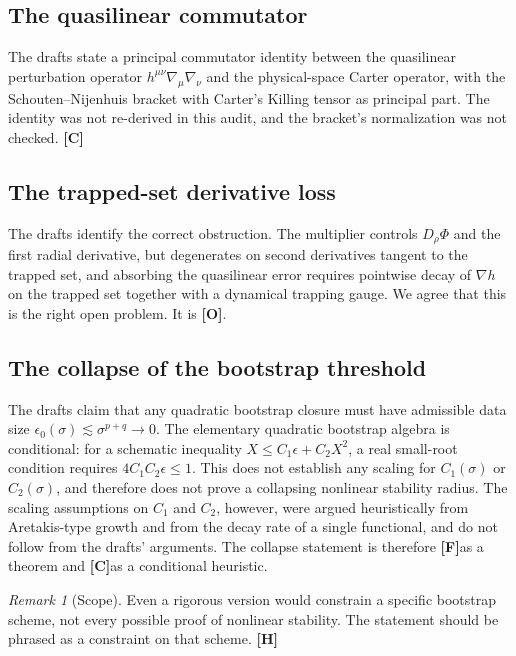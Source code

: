 \documentclass[11pt,a4paper]{article}
\newcommand{\VH}{\textcolor{vh}{\textbf{[H]}}}
\newcommand{\CC}{\textcolor{cc}{\textbf{[C]}}}
\newcommand{\FF}{\textcolor{ff}{\textbf{[F]}}}
\newcommand{\OO}{\textcolor{oo}{\textbf{[O]}}}
\theoremstyle{remark}
\newtheorem{remark}[theorem]{Remark}
\theoremstyle{definition}
\begin{document}
\subsection{The quasilinear commutator}

The drafts state a principal commutator identity between the quasilinear perturbation operator $h^{\mu\nu}\nabla_\mu\nabla_\nu$ and the physical-space Carter operator, with the Schouten--Nijenhuis bracket with Carter's Killing tensor as principal part. The identity was not re-derived in this audit, and the bracket's normalization was not checked. \CC

\subsection{The trapped-set derivative loss}

The drafts identify the correct obstruction. The multiplier controls $D_\rho\Phi$ and the first radial derivative, but degenerates on second derivatives tangent to the trapped set, and absorbing the quasilinear error requires pointwise decay of $\nabla h$ on the trapped set together with a dynamical trapping gauge. We agree that this is the right open problem. It is \OO.

\subsection{The collapse of the bootstrap threshold}

The drafts claim that any quadratic bootstrap closure must have admissible data size $\epsilon_0(\sigma)\lesssim\sigma^{p+q}\to0$. The elementary quadratic bootstrap algebra is conditional: for a schematic inequality $X\le C_1\epsilon+C_2X^2$, a real small-root condition requires $4C_1C_2\epsilon\le1$. This does not establish any scaling for $C_1(\sigma)$ or $C_2(\sigma)$, and therefore does not prove a collapsing nonlinear stability radius. The scaling assumptions on $C_1$ and $C_2$, however, were argued heuristically from Aretakis-type growth and from the decay rate of a single functional, and do not follow from the drafts' arguments. The collapse statement is therefore \FF as a theorem and \CC as a conditional heuristic.

\begin{remark}[Scope]
Even a rigorous version would constrain a specific bootstrap scheme, not every possible proof of nonlinear stability. The statement should be phrased as a constraint on that scheme. \VH
\end{remark}
\end{document}
